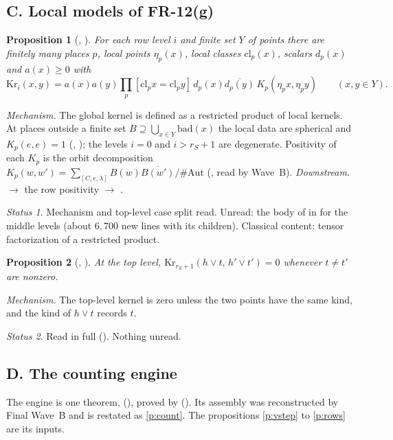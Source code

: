 \documentclass[11pt]{article}
\newcommand{\FR}[1]{\textsf{FR-#1}}
\newtheorem{prop}{Proposition}
\theoremstyle{remark}
\newtheorem*{status}{Status}
\begin{document}
\subsection*{C. Local models of \FR{12}(g)}

\begin{prop}[, ]\label{p:clk}
For each row level $i$ and finite set $Y$ of points there are finitely many places $p$, local points $\eta_p(x)$, local classes $\mathrm{cl}_p(x)$, scalars $d_p(x)$ and $a(x)\ge0$ with
\[
\mathrm{Kr}_i(x,y)=a(x)a(y)\prod_p[\mathrm{cl}_px=\mathrm{cl}_py]\,d_p(x)\overline{d_p(y)}\,K_p(\eta_px,\eta_py)\qquad(x,y\in Y).
\]
\end{prop}
\emph{Mechanism.} The global kernel is defined as a restricted product of local kernels. At places outside a finite set $B\supseteq\bigcup_{x\in Y}\mathrm{bad}(x)$ the local data are spherical and $K_p(e,e)=1$ (, ); the levels $i=0$ and $i> r_S+1$ are degenerate. Positivity of each $K_p$ is the orbit decomposition $K_p(w,w')=\sum_{[C,e,\lambda]}B(w)\overline{B(w')}/\#\mathrm{Aut}$ (, read by Wave~B).
\emph{Downstream.}  $\to$ the row positivity  $\to$ .
\begin{status}Mechanism and top-level case split read. Unread: the body of  in  for the middle levels (about $6{,}700$ new lines with its children). Classical content: tensor factorization of a restricted product.\end{status}

\begin{prop}[, ]\label{p:clt}
At the top level, $\mathrm{Kr}_{r_S+1}(h\vee t,\,h'\vee t')=0$ whenever $t\ne t'$ are nonzero.
\end{prop}
\emph{Mechanism.} The top-level kernel  is zero unless the two points have the same kind, and the kind of $h\vee t$ records $t$.
\begin{status}Read in full (). Nothing unread.\end{status}

\subsection*{D. The counting engine}

The engine is one theorem,  (), proved by  (). Its assembly was reconstructed by Final Wave~B and is restated as \ref{p:count}. The propositions \ref{p:vstep} to \ref{p:rows} are its inputs.
\end{document}
